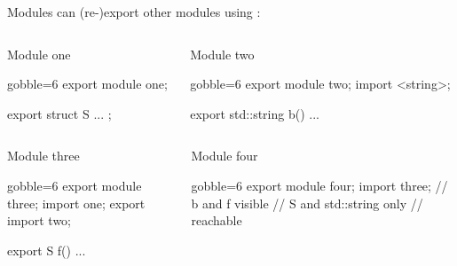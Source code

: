 \begin{frame}[fragile,shrink=5]
  \begin{block}{}
    Modules can (re-)export other modules using :
  \end{block}
  \vspace{-5mm}
  \begin{columns}[t]
    \begin{column}{.45\textwidth}
      \begin{exampleblock}{Module one}
        \begin{cppcode*}{gobble=6}
          export module one;

          export struct S { ... };
        \end{cppcode*}
      \end{exampleblock}
    \end{column}
    \begin{column}{.45\textwidth}
      \begin{exampleblock}{Module two}
        \begin{cppcode*}{gobble=6}
          export module two;
          import <string>;

          export std::string b()
            { ... }
        \end{cppcode*}
      \end{exampleblock}
    \end{column}
  \end{columns}
  \begin{columns}[t]
    \begin{column}{.45\textwidth}
      \begin{exampleblock}{Module three}
        \begin{cppcode*}{gobble=6}
          export module three;
          import one;
          export import two;

          export S f() { ... }
        \end{cppcode*}
      \end{exampleblock}
    \end{column}
    \begin{column}{.45\textwidth}
      \begin{exampleblock}{Module four}
        \begin{cppcode*}{gobble=6}
          export module four;
          import three;
          // b and f visible
          // S and std::string only
          //   reachable
        \end{cppcode*}
      \end{exampleblock}
    \end{column}
  \end{columns}
\end{frame}

